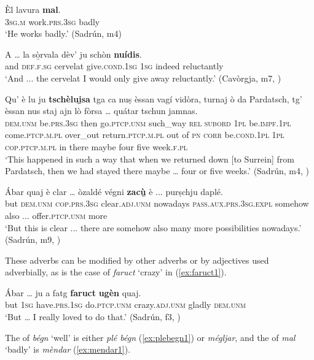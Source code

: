 \ea
\label{ex:mal1}
\gll Èl lavura \textbf{mal}.\\
\textsc{3sg.m} work.\textsc{prs.3sg} badly\\
\glt `He works badly.' (Sadrún, m4)
\z

\ea
\label{ex:nuidis1}
\gll A … la sò̱rvala dèv’ ju schòn \textbf{nuídis}.    \\
and {} \textsc{def.f.sg} cervelat give.\textsc{cond.1sg} \textsc{1sg} indeed reluctantly\\
\glt `And ... the cervelat I would only give away reluctantly.' (Cavòrgja, m7, )
\z

\ea
\label{ex:tscheluisa1}
\gll  Qu' è lu ju \textbf{tschèlui̱sa} tga ca nuṣ èssan vagí vidòra, turnaj ò da Pardatsch, tg' èssan nus staj ajn lò fòrsa … quátar tschun jamnas.  \\
\textsc{dem.unm} be.\textsc{prs.3sg} then go.\textsc{ptcp.unm} such\_way \textsc{rel} \textsc{subord} \textsc{1pl} be.\textsc{impf.1pl} come.\textsc{ptcp.m.pl} over\_out return.\textsc{ptcp.m.pl} out of \textsc{pn} \textsc{corr} be.\textsc{cond.1pl} \textsc{1pl} \textsc{cop.ptcp.m.pl} in there maybe {} four five week.\textsc{f.pl}   \\
\glt `This happened in such a way that when we returned down [to Surrein] from Pardatsch, then we had stayed there maybe … four or five weeks.' (Sadrún, m4, )
\z

\ea
\label{ex:zacù1}
\gll Ábar quaj è clar … òzaldé végni \textbf{zacù̱} è ...  purṣchju daplé.   \\
	but \textsc{dem.unm} \textsc{cop.prs.3sg} clear.\textsc{adj.unm} {} nowadays \textsc{pass.aux.prs.3sg.expl} somehow also ... offer.\textsc{ptcp.unm} more\\
\glt `But this is clear ... there are somehow also many more possibilities nowadays.' (Sadrún, m9, )
\z

These adverbs can be modified by other adverbs or by adjectives used adverbially, as is the case of \textit{faruct} `crazy' in (\ref{ex:faruct1}).

\ea
\label{ex:faruct1}
\gll  Ábar … ju a fatg \textbf{faruct} \textbf{ugèn} quaj.\\
but {} \textsc{1sg} have.\textsc{prs.1sg} do.\textsc{ptcp.unm} crazy.\textsc{adj.unm} gladly \textsc{dem.unm} \\ 
\glt `But … I really loved to do that.' (Sadrún, f3, )
\z

The  of \textit{bégn} `well' is either \textit{plé bégn} (\ref{ex:plebegn1}) or \textit{mégljar}, and the  of \textit{mal} `badly' is \textit{mèndar} (\ref{ex:mendar1}).

